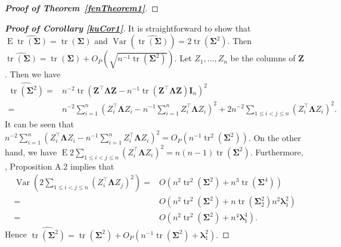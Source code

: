 \documentclass[12pt]{article} %
\DeclareMathOperator{\mytr}{tr}
\DeclareMathOperator{\myE}{E}
\DeclareMathOperator{\myVar}{Var}
\newcommand{\bZ}{\mathbf{Z}}
\newcommand{\bI}{\mathbf{I}}
\newcommand{\bfsym}[1]{\ensuremath{\boldsymbol{#1}}}
\def\blambda {\bfsym {\lambda}}
\def\bLambda {\bfsym {\Lambda}}
\def\bSigma {\bfsym {\Sigma}}
\theoremstyle{definition}
\begin{document}
\begin{appendices}
\begin{proof}[\textbf{Proof of Theorem~\ref{fenTheorem1}}]
    
\end{proof}
\begin{proof}[\textbf{Proof of Corollary \ref{kuCor1}}]
It is straightforward to show that 
$\myE \widehat{\mytr(\bSigma)}=\mytr(\bSigma)$ and 
$\myVar \left(\widehat{\mytr(\bSigma)}\right)=2\mytr(\bSigma^2)$.
Then
$\widehat{\mytr(\bSigma)}=\mytr(\bSigma)+O_P(\sqrt{n^{-1}\mytr(\bSigma^2)})$.
Let $Z_1,\ldots, Z_n$ be the columns of $\bZ$.
Then we have
\begin{equation*}
    \begin{split}
\widehat{\mytr(\bSigma^2)}=&
n^{-2} \mytr(\bZ^\top \bLambda \bZ-n^{-1}\mytr(\bZ^\top \bLambda \bZ)\bI_n)^2
\\
=&
n^{-2} \sum_{i=1}^n (Z_{i}^\top \bLambda Z_i - n^{-1}\sum_{i=1}^n Z_{i}^\top \bLambda Z_i)^2
+
2n^{-2} \sum_{1\leq i < j \leq n} (Z_i^\top \bLambda Z_i)^2.
    \end{split}
\end{equation*}
It can be seen that
$
n^{-2} \sum_{i=1}^n (Z_{i}^\top \bLambda Z_i - n^{-1}\sum_{i=1}^n Z_{i}^\top \bLambda Z_i)^2
=O_P(n^{-1}\mytr^2(\bSigma^2))
$.
    On the other hand, we have $
\myE 2 \sum_{1\leq i < j \leq n} (Z_i^\top \bLambda Z_i)^2
=n(n-1)\mytr(\bSigma^2)
$.
    Furthermore, \cite{chen2010tests}, Proposition A.2 implies that
    \begin{equation*}
        \begin{split}
        \myVar\left(
            2\sum_{1\leq i<j\leq n} (Z_{i}^\top \bLambda Z_{j})^2
        \right)
        =& O\left(
            n^2 \mytr^2 (\bSigma^2) + n^3 \mytr(\bSigma^4)
        \right)
        \\
        =& O\left(
            n^2 \mytr^2 (\bSigma^2) + n \mytr(\bSigma_{2}^2) n^2 \blambda_{1}^2
        \right)
        \\
        =& O\left(
            n^2 \mytr^2 (\bSigma^2) + n^4 \blambda_{1}^4
        \right)
        .
        \end{split}
    \end{equation*}
    Hence
$
\widehat{\mytr(\bSigma^2)}=\mytr(\bSigma^2)+O_P(n^{-1}\mytr(\bSigma^2)+\blambda_1^2).
$



\end{proof}
\end{appendices}
\end{document}

